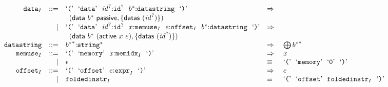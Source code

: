$$
\begin{array}[t]{@{}lrrl@{}l@{}l@{}l@{}}
& {{\mathtt{data}}}_{I} & ::= & \mbox{‘\texttt{{(}}’}~~\mbox{‘\texttt{data}’}~~{{\mathit{id}}^?}{:}{{\mathtt{id}}^?}~~{b^\ast}{:}{\mathtt{datastring}}~~\mbox{‘\texttt{{)}}’} & \quad\Rightarrow\quad{} & & \\
&&& \multicolumn{4}{@{}l@{}}{\quad
\begin{array}[t]{@{}l@{}}
(\mathsf{data}~{b^\ast}~\mathsf{passive}, \{ \mathsf{datas}~({{\mathit{id}}^?}) \}) \\
\end{array}
} \\
& & | & \mbox{‘\texttt{{(}}’}~~\mbox{‘\texttt{data}’}~~{{\mathit{id}}^?}{:}{{\mathtt{id}}^?}~~x{:}{{\mathtt{memuse}}}_{I}~~e{:}{{\mathtt{offset}}}_{I}~~{b^\ast}{:}{\mathtt{datastring}}~~\mbox{‘\texttt{{)}}’} & \quad\Rightarrow\quad{} & & \\
&&& \multicolumn{4}{@{}l@{}}{\quad
\begin{array}[t]{@{}l@{}}
(\mathsf{data}~{b^\ast}~(\mathsf{active}~x~e), \{ \mathsf{datas}~({{\mathit{id}}^?}) \}) \\
\end{array}
} \\
& {\mathtt{datastring}} & ::= & {{b^\ast}^\ast}{:}{{\mathtt{string}}^\ast} & \quad\Rightarrow\quad{} & {\bigoplus}\, {{b^\ast}^\ast} \\
& {{\mathtt{memuse}}}_{I} & ::= & \mbox{‘\texttt{{(}}’}~~\mbox{‘\texttt{memory}’}~~x{:}{{\mathtt{memidx}}}_{I}~~\mbox{‘\texttt{{)}}’} & \quad\Rightarrow\quad{} & x \\
& & | & \epsilon & \quad\equiv\quad{} & \mbox{‘\texttt{{(}}’}~~\mbox{‘\texttt{memory}’}~~\mbox{‘\texttt{0}’}~~\mbox{‘\texttt{{)}}’} \\
& {{\mathtt{offset}}}_{I} & ::= & \mbox{‘\texttt{{(}}’}~~\mbox{‘\texttt{offset}’}~~e{:}{{\mathtt{expr}}}_{I}~~\mbox{‘\texttt{{)}}’} & \quad\Rightarrow\quad{} & e \\
& & | & {{\mathtt{foldedinstr}}}_{I} & \quad\equiv\quad{} & \mbox{‘\texttt{{(}}’}~~\mbox{‘\texttt{offset}’}~~{{\mathtt{foldedinstr}}}_{I}~~\mbox{‘\texttt{{)}}’} \\
\end{array}
$$

\vspace{1ex}

